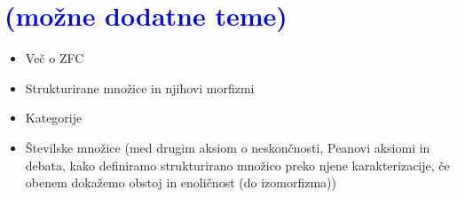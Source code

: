 \documentclass[11pt,a4paper,twoside]{book}
\newcommand{\note}[1]{{\small\textcolor{blue}{(#1)}}}
\begin{document}
	\chapter{\note{možne dodatne teme}}
		\begin{itemize}
			\item
				Več o ZFC
			\item
				Strukturirane množice in njihovi morfizmi
			\item
				Kategorije
			\item
				Številske množice (med drugim aksiom o neskončnosti, Peanovi aksiomi in debata, kako definiramo strukturirano množico preko njene karakterizacije, če obenem dokažemo obstoj in enoličnost (do izomorfizma))
		\end{itemize}
	
	
\end{document}
